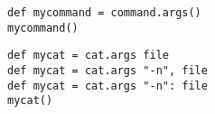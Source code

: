 \begin{lstlisting}[style=Groovybash, label={lst:example_args1}, title={Store 
the command in a variable with no arguments given.}]
def mycommand = command.args()
mycommand()
\end{lstlisting}

\begin{lstlisting}[style=Groovybash, label={lst:example_args2}, title={Store 
the command in a variable with arguments given either direct or by key=value 
pairs.}]
def mycat = cat.args file
def mycat = cat.args "-n", file
def mycat = cat.args "-n": file
mycat()
\end{lstlisting}

